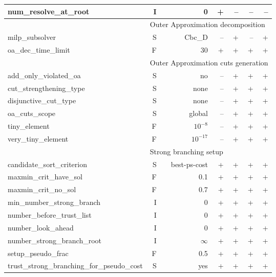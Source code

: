 \begin{center}
\begin{tabular}{|l|r|r|r|r|r|r|}
num\_resolve\_at\_root& I& 0& +&--&--&--\\
\hline
\multicolumn{1}{|c}{} & \multicolumn{6}{l|}{Outer Approximation decomposition}\\
\hline
milp\_subsolver& S& Cbc\_D&--& +&--& +\\
oa\_dec\_time\_limit& F& 30& +& +& +& +\\
\hline
\multicolumn{1}{|c}{} & \multicolumn{6}{l|}{Outer Approximation cuts generation}\\
\hline
add\_only\_violated\_oa& S& no&--& +& +& +\\
cut\_strengthening\_type& S& none&--& +& +& +\\
disjunctive\_cut\_type& S& none&--& +& +& +\\
oa\_cuts\_scope& S& global&--& +& +& +\\
tiny\_element& F& $10^{-8}$&--& +& +& +\\
very\_tiny\_element& F& $10^{-17}$&--& +& +& +\\
\hline
\multicolumn{1}{|c}{} & \multicolumn{6}{l|}{Strong branching setup}\\
\hline
candidate\_sort\_criterion& S& best-ps-cost& +& +& +& +\\
maxmin\_crit\_have\_sol& F& 0.1& +& +& +& +\\
maxmin\_crit\_no\_sol& F& 0.7& +& +& +& +\\
min\_number\_strong\_branch& I& 0& +& +& +& +\\
number\_before\_trust\_list& I& 0& +& +& +& +\\
number\_look\_ahead& I& 0& +& +& +& +\\
number\_strong\_branch\_root& I& $\infty$& +& +& +& +\\
setup\_pseudo\_frac& F& 0.5& +& +& +& +\\
trust\_strong\_branching\_for\_pseudo\_cost& S& yes& +& +& +& +\\
\hline
\end{tabular}
\end{center}



